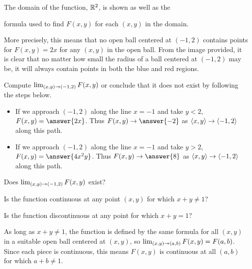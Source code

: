 \documentclass{ximera}
\begin{document}
\begin{exercise}
\begin{exercise}
\begin{feedback}[correct]
\begin{image}
\end{image}
\begin{center}
The domain of the function, $\mathbb R^2$, is shown as well as the 

formula used to find $F(x,y)$ for each $(x,y)$ in the domain.
\end{center}

More precisely, this means that no open ball centered at $(-1,2)$ contains points for $F(x,y) = 2x$ for any $(x,y)$ in the open ball. From the image provided, it is clear that no matter how small the radius of a ball centered at $(-1,2)$ may be, it will always contain points in both the blue and red regions.
\end{feedback}

\begin{exercise}
Compute $\lim_{\left(x,y\right) \to \left(-1,2\right)} F(x,y)$ or conclude that it does not exist by following the steps below.

\begin{itemize}
\item If we approach $(-1,2)$ along the line $x=-1$ and take $y<2$, $F(x,y) = \answer{2x}$.  Thus $F(x,y) \to \answer{-2}$ as $\left\langle x,y\right\rangle \to \left\langle -1,2\right\rangle$ along this path.
\item If we approach $(-1,2)$ along the line $x=-1$ and take $y>2$, $F(x,y) = \answer{4x^2y}$.  Thus $F(x,y) \to \answer{8}$ as $\left\langle x,y\right\rangle \to \left\langle -1,2\right\rangle$ along this path.
\end{itemize}

Does $\lim_{\left(x,y\right) \to \left(-1,2\right)} F(x,y)$ exist? 
\end{exercise}
\end{exercise}

\begin{exercise}
Is the function continuous at any point $(x,y)$ for which $x+y \neq 1$? 

Is the function discontinuous at any point for which $x+y =1$? 

\begin{feedback}[correct]
As long as $x+y \neq 1$, the function is defined by the same formula for all $(x,y)$ in a suitable open ball centered at $(x,y)$, so $\lim_{\left(x,y\right) \to \left(a,b\right)}F(x,y) = F(a,b)$.  Since each piece is continuous, this means $F(x,y)$ is continuous at all $(a,b)$ for which $a+b \neq 1$.


\end{feedback}
\end{exercise}
\end{exercise}
\end{document}
